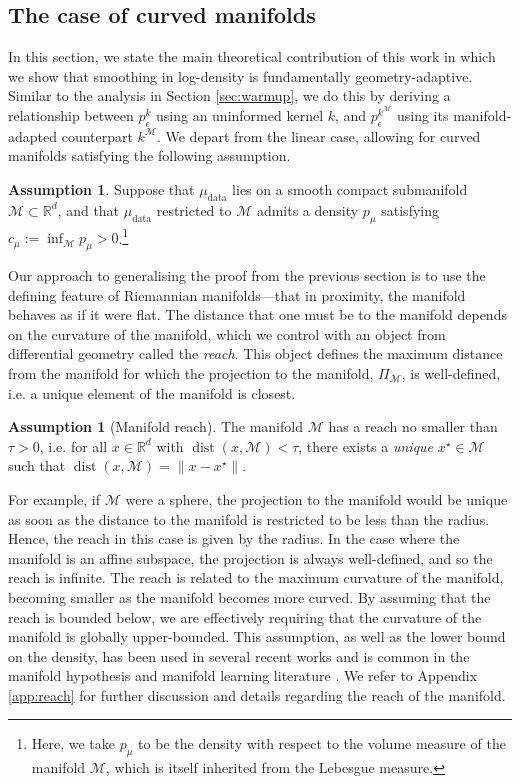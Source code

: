 \documentclass[10pt]{article}
\theoremstyle{plain}
\theoremstyle{definition}
\newtheorem{assumption}[theorem]{Assumption}
\theoremstyle{remark}
\newcommand{\M}{{\mathcal{M}}}
\newcommand{\R}{\mathbb{R}}
\newcommand{\mud}{\mu_{\operatorname{data}}}
\newcommand{\dist}{\operatorname{dist}}
\begin{document}
\subsection{The case of curved manifolds}\label{sec:main_result}
In this section, we state the main theoretical contribution of this work in which we show that smoothing in log-density is fundamentally geometry-adaptive. Similar to the analysis in Section \ref{sec:warmup}, we do this by deriving a relationship between $p_\epsilon^k$ using an uninformed kernel $k$, and $p_\epsilon^{k^\mathcal{M}}$ using its manifold-adapted counterpart $k^\mathcal{M}$. We depart from the linear case, allowing for curved manifolds satisfying the following assumption.

\begin{assumption}\label{ass:manifold}
Suppose that \(\mud\) lies on a smooth compact submanifold \(\M \subset \R^d\), and that \(\mud\) restricted to \(\M\) admits a density \(p_\mu\) satisfying \(c_\mu := \inf_{\M} p_{\mu} > 0\).\footnote{Here, we take \(p_\mu\) to be the density with respect to the volume measure of the manifold \(\M\), which is itself inherited from the Lebesgue measure.}
\end{assumption}

Our approach to generalising the proof from the previous section is to use the defining feature of Riemannian manifolds---that in proximity, the manifold behaves as if it were flat. The distance that one must be to the manifold depends on the curvature of the manifold, which we control with an object from differential geometry called the \textit{reach}. This object defines the maximum distance from the manifold for which the projection to the manifold, \(\Pi_\M\), is well-defined, i.e. a unique element of the manifold is closest.
\begin{assumption}[Manifold reach]\label{ass:reach}
The manifold \(\M\) has a reach no smaller than \(\tau > 0\), i.e. for all \(x \in \R^d\) with \(\dist(x, \M) < \tau\), there exists a \textit{unique} \(x^\star \in \M\) such that \(\dist(x, \M) = \|x - x^\star\|\).
\end{assumption}
For example, if \(\M\) were a sphere, the projection to the manifold would be unique as soon as the distance to the manifold is restricted to be less than the radius. Hence, the reach in this case is given by the radius. In the case where the manifold is an affine subspace, the projection is always well-defined, and so the reach is infinite. The reach is related to the maximum curvature of the manifold, becoming smaller as the manifold becomes more curved. By assuming that the reach is bounded below, we are effectively requiring that the curvature of the manifold is globally upper-bounded. This assumption, as well as the lower bound on the density, has been used in several recent works and is common in the manifold hypothesis and manifold learning literature \citep{Aamari2017-he, potaptchik2024linearconvergencediffusionmodels, azangulov2024convergencediffusionmodelsmanifold}. We refer to Appendix \ref{app:reach} for further discussion and details regarding the reach of the manifold.
\end{document}
